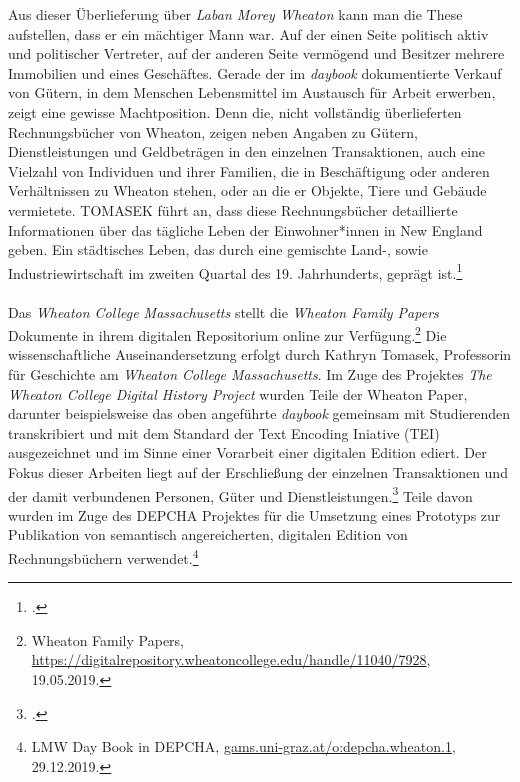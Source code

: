 \documentclass[12pt,a4paper]{article}
\begin{document}
Aus dieser Überlieferung über \textit{Laban Morey Wheaton} kann man die These aufstellen, dass er ein mächtiger Mann war. Auf der einen Seite politisch aktiv und politischer Vertreter, auf der anderen Seite vermögend und Besitzer mehrere Immobilien und eines Geschäftes. Gerade der im \textit{daybook} dokumentierte Verkauf von Gütern, in dem Menschen Lebensmittel im Austausch für Arbeit erwerben, zeigt eine gewisse Machtposition. Denn die, nicht vollständig überlieferten Rechnungsbücher von Wheaton, zeigen neben Angaben zu Gütern, Dienstleistungen und Geldbeträgen in den einzelnen Transaktionen, auch eine Vielzahl von Individuen und ihrer Familien, die in Beschäftigung oder anderen Verhältnissen zu Wheaton stehen, oder an die er Objekte, Tiere und Gebäude vermietete. TOMASEK führt an, dass diese Rechnungsbücher detaillierte Informationen über das tägliche Leben der Einwohner*innen in New England geben. Ein städtisches Leben, das durch eine gemischte Land-, sowie Industriewirtschaft im zweiten Quartal des 19. Jahrhunderts, geprägt ist.\footcite[][S.5]{tomasekmedea}
\\
\\
Das \textit{Wheaton College Massachusetts} stellt die \textit{Wheaton Family Papers} Dokumente in ihrem digitalen Repositorium online zur Verfügung.\footnote{Wheaton Family Papers, \url{https://digitalrepository.wheatoncollege.edu/handle/11040/7928}, 19.05.2019.} Die wissenschaftliche Auseinandersetzung erfolgt durch Kathryn Tomasek, Professorin für Geschichte am \textit{Wheaton College Massachusetts}. Im Zuge des Projektes \textit{The Wheaton College Digital History Project} wurden Teile der Wheaton Paper, darunter beispielsweise das oben angeführte \textit{daybook} gemeinsam mit Studierenden transkribiert und mit dem Standard der Text Encoding Iniative (TEI) ausgezeichnet und im Sinne einer Vorarbeit einer digitalen Edition ediert. Der Fokus dieser Arbeiten liegt auf der Erschließung der einzelnen Transaktionen und der damit verbundenen Personen, Güter und Dienstleistungen.\footcite[TOMASEK Kathryn: The Wheaton College Digital History Project: Undergraduate Research in a Local Collection, \protect\url{https://writinghistory.trincoll.edu/teach/wheaton-college-digital-history-project-tomasek}, 23.05.2019.][S.379]{alexander2012should} Teile davon wurden im Zuge des DEPCHA Projektes für die Umsetzung eines Prototyps zur Publikation von semantisch angereicherten, digitalen Edition von Rechnungsbüchern verwendet.\footnote{LMW Day Book in DEPCHA, \url{gams.uni-graz.at/o:depcha.wheaton.1}, 29.12.2019.}
\\
\end{document}
